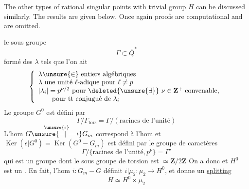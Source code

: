 The other types of rational singular points with trivial group $H$ can be discussed similarly. The results are given below. Once again proofs are computational and are omitted.

le sous groupe
\[
\Gamma\subset\overline Q^*
\]
formé des $\lambda$ tels que l'on ait
\[
\left\{\begin{array}{l}
\lambda\unsure{\in}\ \text{entiers algébriques}\\
\lambda\ \text{une unité }\ell\text{-adique pour }\ell\ne p\\
|\lambda_i|=p^{\nu/2}\ \text{pour }\deleted{\unsure{\exists}}\ \nu\in\mathbf Z^+\ \text{convenable,}\\
\qquad\text{pour tt conjugué de }\lambda_i
\end{array}\right.
\]
Le groupe $G^0$ est défini par
\[
\Gamma/\Gamma_{\mathrm{tors}}=\Gamma/(\text{racines de l'unité})
\]
L'hom $G\overset{\unsure{\epsilon}}{\unsure{\mathbin{-}|\longrightarrow}}G_m$ correspond à l'hom
et $\operatorname{Ker}(\epsilon|G^0)=\operatorname{Ker}(G^0-G_m)$ est défini par le groupe de caractères
\[
\Gamma/\{\text{racines de l'unité},p^\nu\}=\Gamma'
\]
qui est un groupe  dont le sous groupe de torsion est $\simeq\mathbf Z/2\mathbf Z$
On a donc
et $H^0$ est un \uline{}. En fait, l'hom $i:G_m-G$ définit $i|\mu_2:\mu_2\longrightarrow H^0$, et donne un \uline{splitting}
\[
H\simeq H^0\times\mu_2
\]

